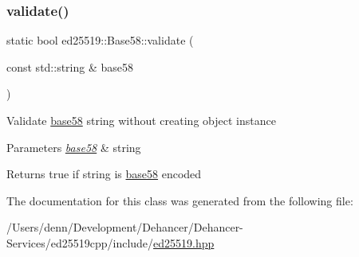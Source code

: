 \mbox{\label{classed25519_1_1_base58_a269a450fc48ef8f77435fdb31b534fb4}} 
\subsubsection{\texorpdfstring{validate()}{validate()}}
{\footnotesize\ttfamily static bool ed25519\+::\+Base58\+::validate (\begin{DoxyParamCaption}\item[{const std\+::string \&}]{base58 }\end{DoxyParamCaption})\hspace{0.3cm}{\ttfamily [static]}}

Validate \mbox{\hyperlink{namespaceed25519_1_1base58}{base58}} string without creating object instance 
\begin{DoxyParams}{Parameters}
{\em \mbox{\hyperlink{namespaceed25519_1_1base58}{base58}}} & string \\
\hline
\end{DoxyParams}
\begin{DoxyReturn}{Returns}
true if string is \mbox{\hyperlink{namespaceed25519_1_1base58}{base58}} encoded 
\end{DoxyReturn}


The documentation for this class was generated from the following file\+:\begin{DoxyCompactItemize}
\item 
/\+Users/denn/\+Development/\+Dehancer/\+Dehancer-\/\+Services/ed25519cpp/include/\mbox{\hyperlink{ed25519_8hpp}{ed25519.\+hpp}}\end{DoxyCompactItemize}
